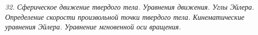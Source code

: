 \emph{32. Сферическое движение твердого тела. Уравнения движения. Углы Эйлера.
Определение скорости произвольной точки твердого тела. Кинематические
уравнения Эйлера. Уравнение мгновенной оси вращения.}

\newpage
